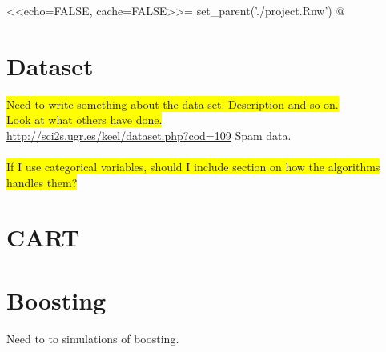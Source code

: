 <<echo=FALSE, cache=FALSE>>=
set_parent('./project.Rnw')
@
\section{Dataset}
\label{sec:Dataset}
\colorbox{yellow}{Need to write something about the data set. Description and so on.}\\
\colorbox{yellow}{Look at what others have done.} \\
\url{http://sci2s.ugr.es/keel/dataset.php?cod=109} Spam data.\\
\\
\colorbox{yellow}{If I use categorical variables, should I include section on how the algorithms handles them?}

\section{CART}
\label{sec:CARTsim}



\section{Boosting}
\label{sec:SimBoosting}
Need to to simulations of boosting.

